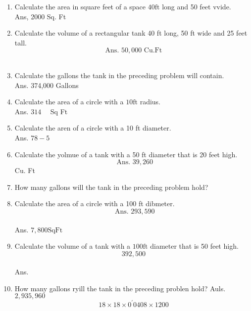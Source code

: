 \begin{enumerate}
\item Calculate the area in square feet of a space $40 \mathrm{ft}$ long and 50 feet vvide.\\
Ans, 2000 Sq. Ft\\

\item Calculate the volume of a rectangular tank 40 ft long, 50 ft wide and 25 feet tall.\\
$$\text { Ans. } 50,000 \text { Cu.Ft }$$\\

\item Calculate the gallons the tank in the preceding problem will contain.\\
Ans. 374,000 Gallons\\


\item Calculate the area of a circle with a $10 \mathrm{ft}$ radius.\\
Ans. $314 \quad$ Sq Ft\\

\item Calculate the aren of a circle with a 10 ft diameter.\\
Ans. $78-5$\\

\item Calculate the yolmue of a tank with a 50 ft diameter that is 20 feet high.\\
$$\text { Ans. } 39,260$$Cu. Ft\\

\item How many gallons will the tank in the preceding problem hold?\\

\item Calculate the area of a circle with a 100 ft dibmeter.\\
$$\text { Ans. } 293,590$$\\
Ans. $7,800 \mathrm{Sq} \mathrm{Ft}$\\

\item Calculate the volume of a tank with a $100 \mathrm{ft}$ diameter that is 50 feet high.\\
$$392,500$$\\
Ans.\\

\item How many gallons ryill the tank in the preceding problen hold? Auls.\\
$2,935,960$\\
$$18 \times 18 \times 0^{\prime} 0408 \times 1200$$\\


\end{enumerate}
